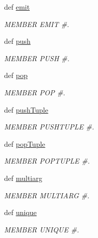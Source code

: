 \begin{DoxyCompactItemize}
def \hyperlink{classscipy_1_1weave_1_1bytecodecompiler_1_1CXXCoder_aea4c0927e7e766076f6068aa95e30880}{emit}
\begin{DoxyCompactList}\small\item\em M\+E\+M\+B\+E\+R E\+M\+I\+T \#. \end{DoxyCompactList}\item 
def \hyperlink{classscipy_1_1weave_1_1bytecodecompiler_1_1CXXCoder_a16f2d510974590f0ffd4a6a18892d5c0}{push}
\begin{DoxyCompactList}\small\item\em M\+E\+M\+B\+E\+R P\+U\+S\+H \#. \end{DoxyCompactList}\item 
def \hyperlink{classscipy_1_1weave_1_1bytecodecompiler_1_1CXXCoder_af477015bc3651c60431883ed3a3edf7a}{pop}
\begin{DoxyCompactList}\small\item\em M\+E\+M\+B\+E\+R P\+O\+P \#. \end{DoxyCompactList}\item 
def \hyperlink{classscipy_1_1weave_1_1bytecodecompiler_1_1CXXCoder_a91e12f74711ef9560e7b37208b47c7e1}{push\+Tuple}
\begin{DoxyCompactList}\small\item\em M\+E\+M\+B\+E\+R P\+U\+S\+H\+T\+U\+P\+L\+E \#. \end{DoxyCompactList}\item 
def \hyperlink{classscipy_1_1weave_1_1bytecodecompiler_1_1CXXCoder_a9af0157b4d752f15e6d95c424adcf1bd}{pop\+Tuple}
\begin{DoxyCompactList}\small\item\em M\+E\+M\+B\+E\+R P\+O\+P\+T\+U\+P\+L\+E \#. \end{DoxyCompactList}\item 
def \hyperlink{classscipy_1_1weave_1_1bytecodecompiler_1_1CXXCoder_a829d777f112490f678db4ed1cd0aac32}{multiarg}
\begin{DoxyCompactList}\small\item\em M\+E\+M\+B\+E\+R M\+U\+L\+T\+I\+A\+R\+G \#. \end{DoxyCompactList}\item 
def \hyperlink{classscipy_1_1weave_1_1bytecodecompiler_1_1CXXCoder_a6ca7587a6c9ea3500a322b2f81166078}{unique}
\begin{DoxyCompactList}\small\item\em M\+E\+M\+B\+E\+R U\+N\+I\+Q\+U\+E \#. \end{DoxyCompactList}\item 

\end{DoxyCompactItemize}
